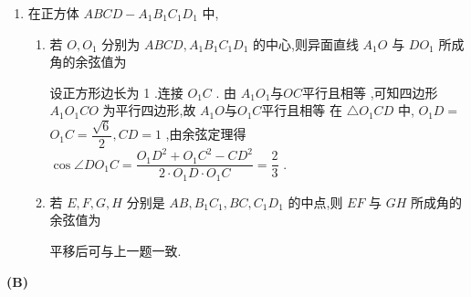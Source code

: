 \begin{enumerate}
\begin{enumerate}
          \begin{jieda}
              在 ${AB}$ 和它在平面 $\alpha$ 上的射影 ${A}^{\prime }{B}^{\prime }$ 确定的平面内,将问题转化为点 $P$ 到 ${A}^{\prime }{B}^{\prime }$ 的距离问题 (平面几何). 当 $A,B$ 在平面 $\alpha$ 同侧时,所求距离为 $a + \dfrac{1}{3}\left( {b - a}\right)  = \dfrac{{2a} + b}{3}$ ; 当 $A,B$ 在平面 $\alpha$ 异侧时,所求距离为 $\left| {a - \dfrac{1}{3}\left( {a + b}\right) }\right|  = \dfrac{\left| 2a - b\right| }{3}.$
          \end{jieda}
      \end{enumerate} 
      \item 在正方体 ${ABCD} - {A}_{1}{B}_{1}{C}_{1}{D}_{1}$ 中,\begin{enumerate}
          \item 若 $O,{O}_{1}$ 分别为 ${ABCD},{A}_{1}{B}_{1}{C}_{1}{D}_{1}$ 的中心,则异面直线 ${A}_{1}O$ 与 $D{O}_{1}$ 所成角的余弦值为
          \begin{jieda}
              设正方形边长为 1 .连接 ${O}_{1}C$ . 由 ${A}_{1}{O}_{1}$与$ {OC}$平行且相等 ,可知四边形 ${A}_{1}{O}_{1}{CO}$ 为平行四边形,故 ${A}_{1}O$与${O}_{1}C$平行且相等 在 $\bigtriangleup  {O}_{1}{CD}$ 中, ${O}_{1}D =$  ${O}_{1}C = \dfrac{\sqrt{6}}{2},{CD} = 1$ ,由余弦定理得 $\cos \angle D{O}_{1}C = \dfrac{{O}_{1}{D}^{2} + {O}_{1}{C}^{2} - C{D}^{2}}{2 \cdot  {O}_{1}D \cdot  {O}_{1}C} = \dfrac{2}{3}$ .
          \end{jieda}
          \item 若 $E,F,G,H$ 分别是 ${AB},{B}_{1}{C}_{1},{BC},{C}_{1}{D}_{1}$ 的中点,则 ${EF}$ 与 ${GH}$ 所成角的余弦值为
          \begin{jieda}
              平移后可与上一题一致.
          \end{jieda}
      \end{enumerate}
\end{enumerate}
\begin{center}  \textbf{(B)} \end{center}
